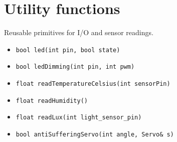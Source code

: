 \section{Utility functions}
Reusable primitives for I/O and sensor readings.
\begin{itemize}
  \item \texttt{bool led(int pin, bool state)}
  \item \texttt{bool ledDimming(int pin, int pwm)}
  \item \texttt{float readTemperatureCelsius(int sensorPin)}
  \item \texttt{float readHumidity()}
  \item \texttt{float readLux(int light\_sensor\_pin)}
  \item \texttt{bool antiSufferingServo(int angle, Servo\& s)}
\end{itemize}
